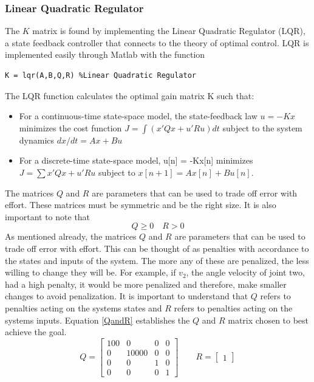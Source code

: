 \documentclass[12pt]{article}
\begin{document}
\subsubsection{Linear Quadratic Regulator}
The $K$ matrix is found by implementing the Linear Quadratic Regulator (LQR), a state feedback controller that connects to the theory of optimal control. LQR is implemented easily through Matlab with the function 
\begin{lstlisting}[frame=single]
K = lqr(A,B,Q,R) %Linear Quadratic Regulator
\end{lstlisting}
The LQR function calculates the optimal gain matrix K such that:
\begin{itemize}
\item For a continuous-time state-space model, the state-feedback law $u = -Kx$  minimizes the cost function $J = \int (x'Qx + u'Ru) dt$ subject to the system dynamics  $dx/dt = Ax + Bu$
\item For a discrete-time state-space model, u[n] = -Kx[n] minimizes $J = \sum {x'Qx + u'Ru} $ subject to  $x[n+1] = Ax[n] + Bu[n]$.
\end{itemize}
The matrices $Q$ and $R$ are parameters that can be used to trade off error with effort. These matrices must be symmetric and be the right size. It is also important to note that
\begin{equation*}
Q \geq 0 \quad R > 0
\end{equation*}
As mentioned already, the matrices $Q$ and $R$ are parameters that can be used to trade off error with effort. This can be thought of as penalties with accordance to the states and inputs of the system. The more any of these are penalized, the less willing to change they will be. For example, if $v_{2}$, the angle velocity of joint two, had a high penalty, it would be more penalized and therefore, make smaller changes to avoid penalization. It is important to understand that $Q$ refers to penalties acting on the systems states and $R$ refers to penalties acting on the systems inputs. Equation \ref{QandR} establishes the $Q$ and $R$ matrix chosen to best achieve the goal.
\begin{equation}
Q = \begin{bmatrix}
100 & 0 & 0 & 0 \\ 0 & 10000 & 0 & 0 \\ 0 & 0 & 1 & 0 \\ 0 & 0 & 0 & 1
\end{bmatrix}
\qquad  
R = \begin{bmatrix}1\end{bmatrix}
\label{QandR}
\end{equation}
\end{document}
